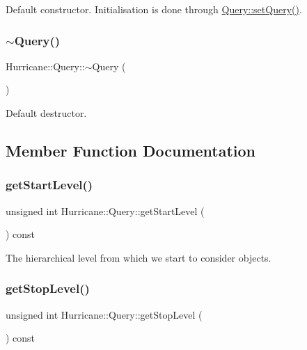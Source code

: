 Default constructor. Initialisation is done through \mbox{\hyperlink{classHurricane_1_1Query_a63c50b61799b729ff4b2e7e291959b4d}{Query\+::set\+Query()}}. \mbox{\label{classHurricane_1_1Query_acd18d98c6bf30dd049916508a397391a}} 
\subsubsection{\texorpdfstring{$\sim$\+Query()}{~Query()}}
{\footnotesize\ttfamily Hurricane\+::\+Query\+::$\sim$\+Query (\begin{DoxyParamCaption}{ }\end{DoxyParamCaption})\hspace{0.3cm}{\ttfamily [virtual]}}

Default destructor. 

\subsection{Member Function Documentation}
\mbox{\label{classHurricane_1_1Query_a7aac7fbdc96df19e7249bf8993eb355f}} 
\subsubsection{\texorpdfstring{get\+Start\+Level()}{getStartLevel()}}
{\footnotesize\ttfamily unsigned int Hurricane\+::\+Query\+::get\+Start\+Level (\begin{DoxyParamCaption}{ }\end{DoxyParamCaption}) const\hspace{0.3cm}{\ttfamily [inline]}}

The hierarchical level from which we start to consider objects. \mbox{\label{classHurricane_1_1Query_a3544d22dbb0685208c590cef09412796}} 
\subsubsection{\texorpdfstring{get\+Stop\+Level()}{getStopLevel()}}
{\footnotesize\ttfamily unsigned int Hurricane\+::\+Query\+::get\+Stop\+Level (\begin{DoxyParamCaption}{ }\end{DoxyParamCaption}) const\hspace{0.3cm}{\ttfamily [inline]}}

